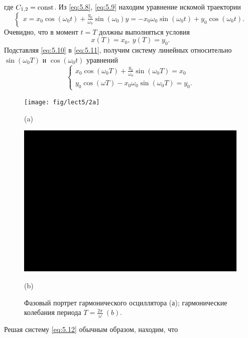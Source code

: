 где $C_{1,2}= \textrm{const}$. Из \eqref{eq:5.8}, \eqref{eq:5.9} находим уравнение искомой траектории
\begin{equation}
        \label{eq:5.10}
        \begin{cases}
                x=x_0 \cos(\omega_0t) + \frac{y_0}{\omega_0} \sin(\omega_0)
                y = -x_0\omega_0\sin(\omega_0t) + y_0\cos(\omega_0t). 
        \end{cases}
\end{equation}
Очевидно, что в момент $t=T$  должны выполняться условия
\begin{equation}
        \label{eq:5.11}
        x(T) = x_0, ~ y(T)=y_0.
\end{equation}
Подставляя \eqref{eq:5.10} в \eqref{eq:5.11}, получим систему линейных относительно $\sin(\omega_0 T)$ и $\cos(\omega_0t)$ уравнений
 \begin{equation}
        \label{eq:5.12}
        \begin{cases}
                x_0 \cos(\omega_0 T) + \frac{y_0}{\omega_0} \sin(\omega_0 T) = x_0\\
                y_0 \cos(\omega T) - x_0\omega_0 \sin(\omega_0 T) = y_0.
        \end{cases}
\end{equation}

\begin{figure}[h!]
        \centering
        \begin{minipage}{0.45\linewidth}
                \centering  
                \texttt{[image: fig/lect5/2a]}

                (a)
        \end{minipage}
        \begin{minipage}{0.45\linewidth}
                \centering  
                \includegraphics[]{fig/lect5/2b}

                (b)      
        \end{minipage}
        \caption{Фазовый портрет гармонического осциллятора (а); гармонические колебания периода
        $T =  \frac{2\pi}{\omega}~ (b)$.}
        \label{fig:5.2}
\end{figure}
Решая систему \eqref{eq:5.12} обычным образом, находим, что

